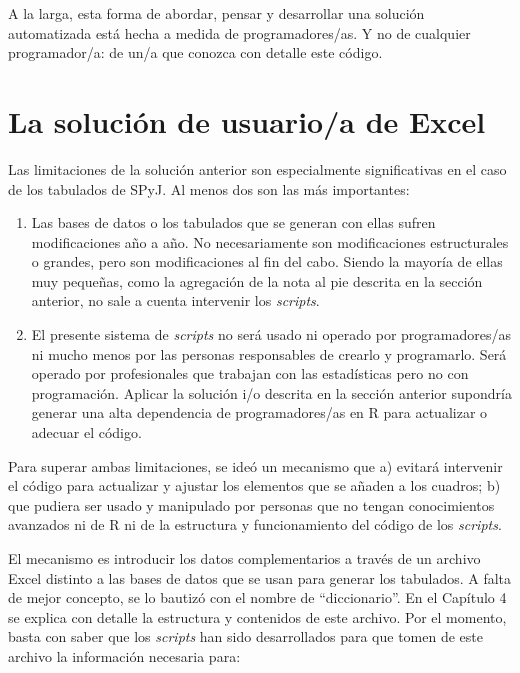\documentclass[
  spanish,
]{book}
\begin{document}
A la larga, esta forma de abordar, pensar y desarrollar una solución automatizada está hecha a medida de programadores/as. Y no de cualquier programador/a: de un/a que conozca con detalle este código.

\hypertarget{la-soluciuxf3n-de-usuarioa-de-excel}{%
\section{La solución de usuario/a de Excel}\label{la-soluciuxf3n-de-usuarioa-de-excel}}

Las limitaciones de la solución anterior son especialmente significativas en el caso de los tabulados de SPyJ. Al menos dos son las más importantes:

\begin{enumerate}
\def\labelenumi{\arabic{enumi}.}
\item
  Las bases de datos o los tabulados que se generan con ellas sufren modificaciones año a año. No necesariamente son modificaciones estructurales o grandes, pero son modificaciones al fin del cabo. Siendo la mayoría de ellas muy pequeñas, como la agregación de la nota al pie descrita en la sección anterior, no sale a cuenta intervenir los \emph{scripts}.
\item
  El presente sistema de \emph{scripts} no será usado ni operado por programadores/as ni mucho menos por las personas responsables de crearlo y programarlo. Será operado por profesionales que trabajan con las estadísticas pero no con programación. Aplicar la solución i/o descrita en la sección anterior supondría generar una alta dependencia de programadores/as en R para actualizar o adecuar el código.
\end{enumerate}

Para superar ambas limitaciones, se ideó un mecanismo que a) evitará intervenir el código para actualizar y ajustar los elementos que se añaden a los cuadros; b) que pudiera ser usado y manipulado por personas que no tengan conocimientos avanzados ni de R ni de la estructura y funcionamiento del código de los \emph{scripts}.

El mecanismo es introducir los datos complementarios a través de un archivo Excel distinto a las bases de datos que se usan para generar los tabulados. A falta de mejor concepto, se lo bautizó con el nombre de ``diccionario''. En el Capítulo 4 se explica con detalle la estructura y contenidos de este archivo. Por el momento, basta con saber que los \emph{scripts} han sido desarrollados para que tomen de este archivo la información necesaria para:
\end{document}
